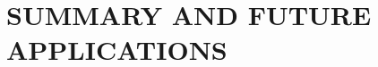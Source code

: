 \documentclass[useAMS,usenatbib]{mn2e}
\begin{document}
\section{SUMMARY AND FUTURE APPLICATIONS}
\label{sec: summary}


\end{document}
